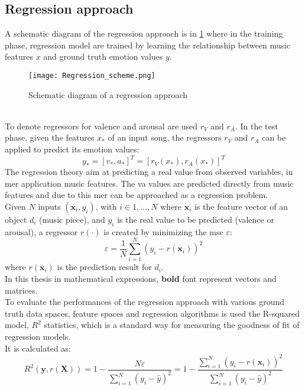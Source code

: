 \subsection{Regression approach}
A schematic diagram of the regression approach is in \ref{fig:Regression_scheme} where in the training phase, regression model are trained by learning the relationship between music features $x$ and ground truth emotion values $y$.
\\
\begin{figure}[h]
    \centering
    \texttt{[image: Regression\_scheme.png]} 
	\caption{Schematic diagram of a regression approach}
    \label{fig:Regression_scheme}
\end{figure}
\\
To denote regressors for valence and arousal are used $r_V$ and $r_A$. In the test phase, given the features $x_*$ of an input song, the regressors $r_V$ and $r_A$ can be applied to predict its emotion values:
\begin{equation}
	y_*=[v_*,a_*]^T = [r_V(x_*), r_A(x_*)]^T
\end{equation}
The regression theory aim at predicting a real value from observed variables, in \gls{mer} application music features.  The \gls{va} values are predicted directly from music features and due to this \gls{mer} can be approached as a regression problem.
\\ \indent
Given $N$ inputs $(\textbf{x}_i,y_i)$, with $i \in {1, ..., N}$ where $\textbf{x}_i$ is the feature vector of an object $d_i$ (music piece), and $y_i$ is the real value to be predicted (valence or arousal), a regressor $r(\cdot)$ is created by minimizing the \gls{mse} $\varepsilon$:
\begin{equation}
	\varepsilon = \dfrac{1}{N} \sum_{i=1}^{N} (y_i-r(\textbf{x}_i))^2
\end{equation}
where $r(\textbf{x}_i)$ is the prediction result for $d_i$.
\\
In this thesis in mathematical expressions, \textbf{bold} font represent vectors and matrices.
\\ \indent
To evaluate the performances of the regression approach with various ground truth data spaces, feature spaces and regression algorithms is used the R-squared model, $R^2$ statistics, which is a standard way for measuring the goodness of fit of regression models.
\\
It is calculated as:
\begin{equation}
	R^2(\textbf{y},r(\textbf{X}))=1-\dfrac{N\varepsilon}{\sum_{i=1}^{N} (y_i-\widehat{y})^2}=1-\dfrac{\sum_{i=1}^{N} (y_i-r(\textbf{x}_i))^2}{\sum_{i=1}^{N} (y_i-\widehat{y})^2}
\end{equation}
